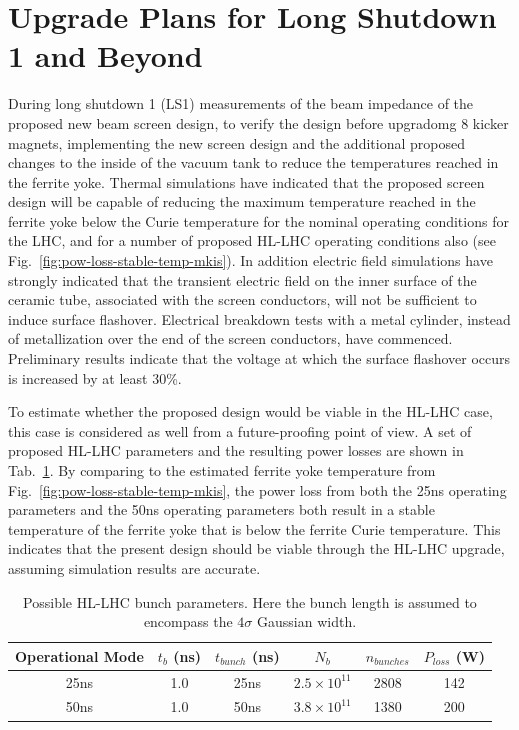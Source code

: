 \section{Upgrade Plans for Long Shutdown 1 and Beyond}

During long shutdown 1 (LS1) measurements of the beam impedance of the proposed new beam screen design, to verify the design before upgradomg 8 kicker magnets, implementing the new screen design and the additional proposed changes to the inside of the vacuum tank to reduce the temperatures reached in the ferrite yoke. Thermal simulations have indicated that the proposed screen design will be capable of reducing the maximum temperature reached in the ferrite yoke below the Curie temperature for the nominal operating conditions for the LHC, and for a number of proposed HL-LHC operating conditions also (see Fig.~\ref{fig:pow-loss-stable-temp-mkis}). In addition electric field simulations have strongly indicated that the transient electric field on the inner surface of the ceramic tube, associated with the screen conductors, will not be sufficient to induce surface flashover. Electrical breakdown tests with a metal cylinder, instead of metallization over the end of the screen conductors, have commenced. Preliminary results indicate that the voltage at which the surface flashover occurs is increased by at least 30\%.

To estimate whether the proposed design would be viable in the HL-LHC case, this case is considered as well from a future-proofing point of view. A set of proposed HL-LHC parameters and the resulting power losses are shown in Tab.~\ref{tab:BrenHLPara}. By comparing to the estimated ferrite yoke temperature from Fig.~\ref{fig:pow-loss-stable-temp-mkis}, the power loss from both the 25ns operating parameters and the 50ns operating parameters both result in a stable temperature of the ferrite yoke that is below the ferrite Curie temperature. This indicates that the present design should be viable through the HL-LHC upgrade, assuming simulation results are accurate.

\begin{table}
\caption{Possible HL-LHC bunch parameters. Here the bunch length is assumed to encompass the $4\sigma$ Gaussian width.}
\label{tab:BrenHLPara}
\begin{center}
\begin{tabular}{c | c | c | c | c | c}
Operational Mode & $t_{b}$ (ns) & $t_{bunch}$ (ns) & $N_{b}$ & $n_{bunches}$ & $P_{loss}$ (W)\\ \hline
25ns & 1.0 & 25ns & $2.5 \times 10^{11}$ & 2808 & 142\\ \hline
50ns & 1.0 & 50ns & $3.8 \times 10^{11}$ & 1380 & 200\\ 
\end{tabular}
\end{center}
\end{table}

